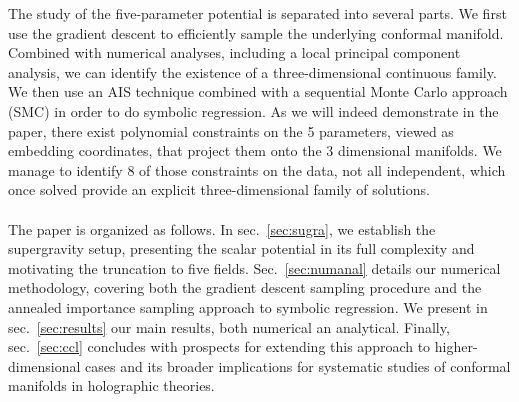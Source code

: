 \documentclass[11pt,a4paper]{article}
\begin{document}
The study of the five-parameter potential is separated into several parts. We first use the gradient descent to efficiently sample the underlying conformal manifold. Combined with numerical analyses, including a local principal component analysis, we can identify the existence of a three-dimensional continuous family. We then use an AIS technique combined with a sequential Monte Carlo approach (SMC) \cite{del2006sequential} in order to do symbolic regression. As we will indeed demonstrate in the paper, there exist polynomial constraints on the 5 parameters, viewed as embedding coordinates, that project them onto the 3 dimensional manifolds. We manage to identify 8 of those constraints on the data, not all independent, which once solved  provide an explicit three-dimensional family of solutions.

\paragraph{}
The paper is organized as follows. In sec.~\ref{sec:sugra}, we establish the supergravity setup, presenting the scalar potential in its full complexity and motivating the truncation to five fields. Sec.~\ref{sec:numanal} details our numerical methodology, covering both the gradient descent sampling procedure and the annealed importance sampling approach to symbolic regression. We present in sec.~\ref{sec:results} our main results, both numerical an analytical. Finally, sec.~\ref{sec:ccl} concludes with prospects for extending this approach to higher-dimensional cases and its broader implications for systematic studies of conformal manifolds in holographic theories.


\end{document}
